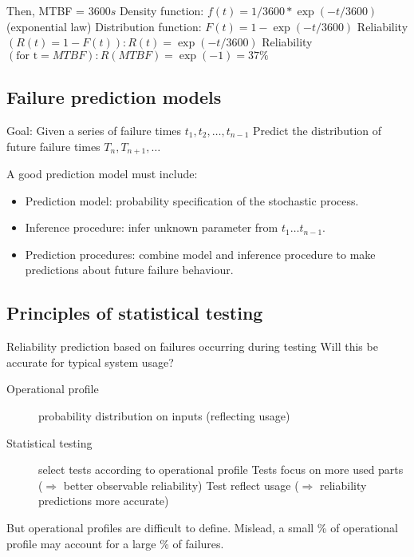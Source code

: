 Then, MTBF = $3600 s$ \newline
Density function: $f(t) = 1/3600 * \exp( -t / 3600)$ (exponential law) \newline
Distribution function: $F(t) = 1 - \exp(-t / 3600)$ \newline
Reliability $(R (t) = 1 - F(t)) : R(t) = \exp(-t / 3600)$ \newline
Reliability $(\textrm{for t} = MTBF): R(MTBF) = \exp(-1) = 37\%$ \newline

\subsection{Failure prediction models}
Goal: Given a series of failure times ${t}_{1}, {t}_{2},\ldots, {t}_{n-1}$ \newline
Predict the distribution of future failure times ${T}_{n}, {T}_{n+1},\ldots$ \newline

A good prediction model must include:

\begin{itemize}
    \item Prediction model: probability specification of the stochastic process.
    \item Inference procedure: infer unknown parameter from ${t}_{1}\ldots{t}_{n-1}$.
    \item Prediction procedures: combine model and inference procedure to make predictions about future failure behaviour.
\end{itemize}

\subsection{Principles of statistical testing}

Reliability prediction based on failures occurring during testing \newline
Will this be accurate for typical system usage? \newline

\begin{description}
    \item[Operational profile] probability distribution on inputs (reflecting usage)
    \item[Statistical testing] select tests according to operational profile
        \subitem{} Tests focus on more used parts ($\Rightarrow$ better observable reliability)
        \subitem{} Test reflect usage ($\Rightarrow$ reliability predictions more accurate)
\end{description}

But operational profiles are difficult to define.\newline
Mislead, a small \% of operational profile may account for a large \% of failures.
